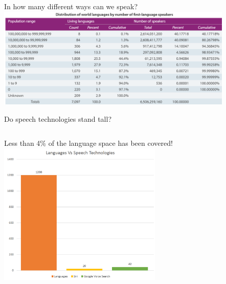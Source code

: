 \begin{frame}{In how many different ways can we speak?}
\includegraphics[height=48mm]{figures/languages}
\end{frame}

\begin{frame}{Do speech technologies stand tall?}
\begin{columns}[T]
    \column{1.4in}
     \vspace{2.5cm}
     \alert{Less than 4\%} of the language space has been covered!
     \column{2.8in}
     \includegraphics[height=68mm]{figures/lan_tech}
  \end{columns}
\end{frame}

